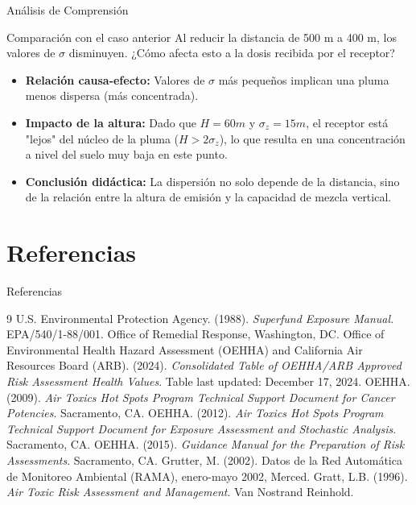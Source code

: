 \documentclass[10pt,compress]{beamer}
\begin{document}
\begin{frame}{Análisis de Comprensión}
    \begin{alertblock}{Comparación con el caso anterior}
        Al reducir la distancia de 500 m a 400 m, los valores de $\sigma$ disminuyen. ¿Cómo afecta esto a la dosis recibida por el receptor?
    \end{alertblock}
    \begin{itemize}
        \item \textbf{Relación causa-efecto:} Valores de $\sigma$ más pequeños implican una pluma menos dispersa (más concentrada).
        \item \textbf{Impacto de la altura:} Dado que $H=60m$ y $\sigma_z=15m$, el receptor está "lejos" del núcleo de la pluma ($H > 2\sigma_z$), lo que resulta en una concentración a nivel del suelo muy baja en este punto.
        \item \textbf{Conclusión didáctica:} La dispersión no solo depende de la distancia, sino de la relación entre la altura de emisión y la capacidad de mezcla vertical.
    \end{itemize}
\end{frame}

\section{Referencias}
\begin{frame}{Referencias}
\begin{thebibliography}{9}
 U.S. Environmental Protection Agency. (1988). \emph{Superfund Exposure Manual}. EPA/540/1-88/001. Office of Remedial Response, Washington, DC.
 Office of Environmental Health Hazard Assessment (OEHHA) and California Air Resources Board (ARB). (2024). \emph{Consolidated Table of OEHHA/ARB Approved Risk Assessment Health Values}. Table last updated: December 17, 2024.
 OEHHA. (2009). \emph{Air Toxics Hot Spots Program Technical Support Document for Cancer Potencies}. Sacramento, CA.
 OEHHA. (2012). \emph{Air Toxics Hot Spots Program Technical Support Document for Exposure Assessment and Stochastic Analysis}. Sacramento, CA.
 OEHHA. (2015). \emph{Guidance Manual for the Preparation of Risk Assessments}. Sacramento, CA.
 Grutter, M. (2002). Datos de la Red Automática de Monitoreo Ambiental (RAMA), enero-mayo 2002, Merced.
 Gratt, L.B. (1996). \emph{Air Toxic Risk Assessment and Management}. Van Nostrand Reinhold.
\end{thebibliography}
\end{frame}
\end{document}
